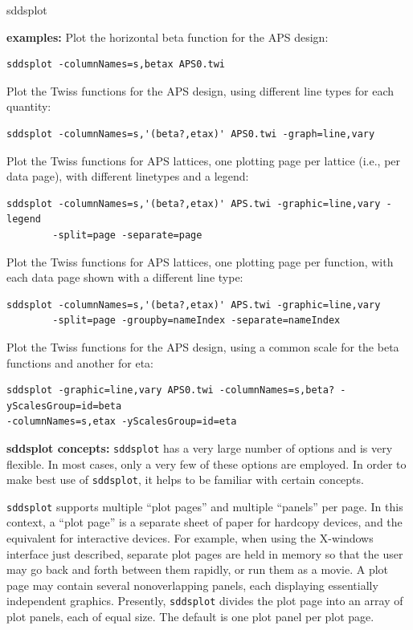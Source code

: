 \begin{sddsprog}{sddsplot}
  \item \textbf{examples:}
    Plot the horizontal beta function for the APS design:
    \begin{verbatim}
sddsplot -columnNames=s,betax APS0.twi
    \end{verbatim}
    Plot the Twiss functions for the APS design, using different line types for
    each quantity:
    \begin{verbatim}
sddsplot -columnNames=s,'(beta?,etax)' APS0.twi -graph=line,vary
    \end{verbatim}
    Plot the Twiss functions for APS lattices, one plotting page per lattice (i.e., per
    data page), with different linetypes and a legend:
    \begin{verbatim}
sddsplot -columnNames=s,'(beta?,etax)' APS.twi -graphic=line,vary -legend
        -split=page -separate=page
    \end{verbatim}
    Plot the Twiss functions for APS lattices, one plotting page per function, with each
    data page shown with a different line type:
    \begin{verbatim}
sddsplot -columnNames=s,'(beta?,etax)' APS.twi -graphic=line,vary
        -split=page -groupby=nameIndex -separate=nameIndex
    \end{verbatim}
    Plot the Twiss functions for the APS design, using a common scale for the beta functions
    and another for eta:
    \begin{verbatim}
sddsplot -graphic=line,vary APS0.twi -columnNames=s,beta? -yScalesGroup=id=beta
-columnNames=s,etax -yScalesGroup=id=eta
    \end{verbatim}

  \item \textbf{sddsplot concepts:}
\verb|sddsplot| has a very large number of options and is very flexible.   In most cases, only a very few
of these options are employed.  In order to make best use of \verb|sddsplot|, it helps to be familiar with
certain concepts. 

\verb|sddsplot| supports multiple ``plot pages'' and multiple ``panels'' per page.  In this context, a
``plot page'' is a separate sheet of paper for hardcopy devices, and the equivalent for interactive
devices.  For example, when using the X-windows interface just described, separate plot pages are held in
memory so that the user may go back and forth between them rapidly, or run them as a movie.  A plot page
may contain several nonoverlapping panels, each displaying essentially independent graphics.  Presently,
\verb|sddsplot| divides the plot page into an array of plot panels, each of equal size.  The default is one
plot panel per plot page.


\end{sddsprog}
